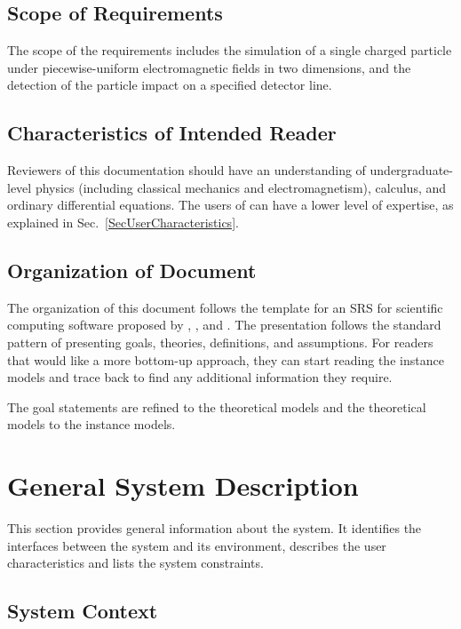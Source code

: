 \documentclass[12pt]{article}
\begin{document}
\subsection{Scope of Requirements}

The scope of the requirements includes the simulation of a single charged particle
under piecewise-uniform electromagnetic fields in two dimensions, and the detection
of the particle impact on a specified detector line.

\subsection{Characteristics of Intended Reader} \label{SecIntendedReader}

Reviewers of this documentation should have an understanding of
undergraduate-level physics (including classical mechanics and electromagnetism),
calculus, and ordinary differential equations.  The users of \progname{} can have
a lower level of expertise, as explained in Sec.~\ref{SecUserCharacteristics}.

\subsection{Organization of Document}

The organization of this document follows the template for an SRS for scientific
computing software proposed by \cite{SmithAndKoothoor2016}, \cite{SmithEtAl2007},
and \cite{SmithAndLai2005}.  The presentation follows the standard pattern of
presenting goals, theories, definitions, and assumptions.  For readers that would
like a more bottom-up approach, they can start reading the instance models and
trace back to find any additional information they require.

The goal statements are refined to the theoretical models and the theoretical
models to the instance models.

\section{General System Description}

This section provides general information about the system. It identifies the
interfaces between the system and its environment, describes the user
characteristics and lists the system constraints.

\subsection{System Context}
\end{document}
